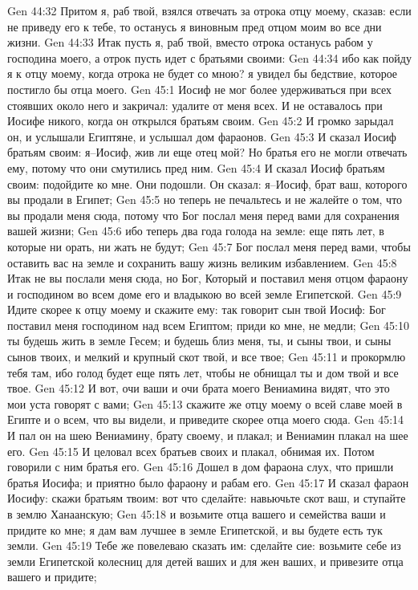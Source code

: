 Gen 44:32  Притом я, раб твой, взялся отвечать за отрока отцу моему, сказав: если не приведу его к тебе, то останусь я виновным пред отцом моим во все дни жизни.
Gen 44:33  Итак пусть я, раб твой, вместо отрока останусь рабом у господина моего, а отрок пусть идет с братьями своими:
Gen 44:34  ибо как пойду я к отцу моему, когда отрока не будет со мною? я увидел бы бедствие, которое постигло бы отца моего.
Gen 45:1  Иосиф не мог более удерживаться при всех стоявших около него и закричал: удалите от меня всех. И не оставалось при Иосифе никого, когда он открылся братьям своим.
Gen 45:2  И громко зарыдал он, и услышали Египтяне, и услышал дом фараонов.
Gen 45:3  И сказал Иосиф братьям своим: я--Иосиф, жив ли еще отец мой? Но братья его не могли отвечать ему, потому что они смутились пред ним.
Gen 45:4  И сказал Иосиф братьям своим: подойдите ко мне. Они подошли. Он сказал: я--Иосиф, брат ваш, которого вы продали в Египет;
Gen 45:5  но теперь не печальтесь и не жалейте о том, что вы продали меня сюда, потому что Бог послал меня перед вами для сохранения вашей жизни;
Gen 45:6  ибо теперь два года голода на земле: еще пять лет, в которые ни орать, ни жать не будут;
Gen 45:7  Бог послал меня перед вами, чтобы оставить вас на земле и сохранить вашу жизнь великим избавлением.
Gen 45:8  Итак не вы послали меня сюда, но Бог, Который и поставил меня отцом фараону и господином во всем доме его и владыкою во всей земле Египетской.
Gen 45:9  Идите скорее к отцу моему и скажите ему: так говорит сын твой Иосиф: Бог поставил меня господином над всем Египтом; приди ко мне, не медли;
Gen 45:10  ты будешь жить в земле Гесем; и будешь близ меня, ты, и сыны твои, и сыны сынов твоих, и мелкий и крупный скот твой, и все твое;
Gen 45:11  и прокормлю тебя там, ибо голод будет еще пять лет, чтобы не обнищал ты и дом твой и все твое.
Gen 45:12  И вот, очи ваши и очи брата моего Вениамина видят, что это мои уста говорят с вами;
Gen 45:13  скажите же отцу моему о всей славе моей в Египте и о всем, что вы видели, и приведите скорее отца моего сюда.
Gen 45:14  И пал он на шею Вениамину, брату своему, и плакал; и Вениамин плакал на шее его.
Gen 45:15  И целовал всех братьев своих и плакал, обнимая их. Потом говорили с ним братья его.
Gen 45:16  Дошел в дом фараона слух, что пришли братья Иосифа; и приятно было фараону и рабам его.
Gen 45:17  И сказал фараон Иосифу: скажи братьям твоим: вот что сделайте: навьючьте скот ваш, и ступайте в землю Ханаанскую;
Gen 45:18  и возьмите отца вашего и семейства ваши и придите ко мне; я дам вам лучшее в земле Египетской, и вы будете есть тук земли.
Gen 45:19  Тебе же повелеваю сказать им: сделайте сие: возьмите себе из земли Египетской колесниц для детей ваших и для жен ваших, и привезите отца вашего и придите;
